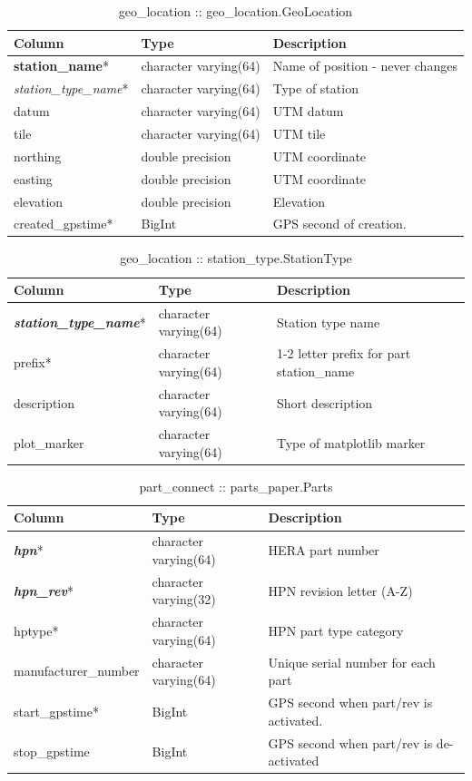 \documentclass{article}[10pt]
\begin{document}
\begin{table}[h]
\centering
\caption{geo\_location :: geo\_location.GeoLocation}
\begin{tabular}{| l | l | l |} \hline
{\bf Column} & {\bf Type} & {\bf Description} \\ \hline
{\bf station\_name}*  & character varying(64) & Name of position - never changes \\ \hline
{\em station\_type\_name}* & character varying(64) & Type of station \\ \hline
datum & character varying(64) & UTM datum \\ \hline
tile & character varying(64) & UTM tile \\ \hline
northing & double precision & UTM coordinate \\ \hline
easting & double precision & UTM coordinate \\ \hline
elevation & double precision & Elevation \\ \hline
created\_gpstime* & BigInt & GPS second of creation. \\ \hline
\end{tabular}
\end{table}

\begin{table}[h]
\centering
\caption{geo\_location :: station\_type.StationType}
\begin{tabular}{| l | l | l |} \hline
{\bf Column} & {\bf Type} & {\bf Description} \\ \hline
{\bf \em station\_type\_name}* &  character varying(64) &  Station type name \\ \hline
prefix* & character varying(64) & 1-2 letter prefix for part station\_name \\ \hline
description & character varying(64) &  Short description \\ \hline
plot\_marker & character varying(64) & Type of matplotlib marker \\ \hline
\end{tabular}
\end{table}

\begin{table}[h]
\centering
\caption{part\_connect :: parts\_paper.Parts}
\begin{tabular}{| l | l | l |} \hline
{\bf Column} & {\bf Type} & {\bf Description} \\ \hline
{\bf \em hpn}* & character varying(64) & HERA part number \\ \hline
{\bf \em hpn\_rev}* & character varying(32) & HPN revision letter (A-Z) \\ \hline
hptype*  &  character varying(64) & HPN part type category \\ \hline
manufacturer\_number & character varying(64) & Unique serial number for each part \\ \hline
start\_gpstime* & BigInt & GPS second when part/rev is activated. \\ \hline
stop\_gpstime & BigInt & GPS second when part/rev is de-activated \\ \hline
\end{tabular}
\end{table}
\end{document}
